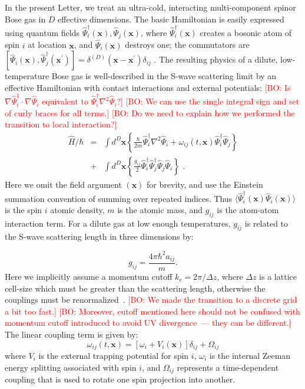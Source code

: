 \documentclass[aps,prl,twocolumn,showpacs,amsmath,amssymb,superscriptaddress]{revtex4-1}
\newcommand{\bogdansremark}[1]{\textcolor{red}{{[}BO: #1{]}}}
\newcommand{\bx}{\boldsymbol{x}}
\begin{document}
In the present Letter, we treat an ultra-cold,
interacting multi-component spinor Bose gas in $D$ effective dimensions.
The basic Hamiltonian is easily expressed using quantum fields
$\widehat{\Psi}_{i}^{\dagger}(\bx),\widehat{\Psi}_{j}(\bx)$,
where $\widehat{\Psi}_{i}^{\dagger}(\bx)$ creates a bosonic atom of spin $i$
at location $\bx$, and $\widehat{\Psi}_{i}(\bx)$ destroys one;
the commutators are
$[\widehat{\Psi}_{i}(\bx),\widehat{\Psi}_{j}^{\dagger}(\bx^\prime)] =
\delta^{(D)}(\bx-\bx^\prime)\delta_{ij}\,\,.$
The resulting physics of a dilute, low-temperature Bose gas
is well-described in the S-wave scattering limit by an effective Hamiltonian
with contact interactions and external potentials:
	\bogdansremark{Is $\nabla \widehat{\Psi}_{i}^{\dagger} \cdot \nabla \widehat{\Psi}_{i}$
	equivalent to $\widehat{\Psi}_{i}^{\dagger} \nabla^2 \widehat{\Psi}_{i}$?}
	\bogdansremark{We can use the single integral sign and set of curly braces for all terms.}
	\bogdansremark{Do we need to explain how we performed the transition to local interaction?}
\begin{eqnarray}
	\widehat{H}/\hbar & = & \int d^{D}\bx \left\{
		\frac{\hbar}{2m} \widehat{\Psi}_{i}^{\dagger} \nabla^2 \widehat{\Psi}_{i} +
		\omega_{ij}(t,\bx) \widehat{\Psi}_{i}^{\dagger} \widehat{\Psi}_{j}
	\right\} \nonumber \\
	& + & \int d^{D}\bx \left\{
		\frac{g_{ij}}{2} \widehat{\Psi}_{i}^{\dagger} \widehat{\Psi}_{j}^{\dagger}
		\widehat{\Psi}_{j} \widehat{\Psi}_{i}
	\right\} \,\,.
\end{eqnarray}
Here we omit the field argument $(\bx)$ for brevity,
and use the Einstein summation convention of summing over repeated indices.
Thus $\langle \widehat{\Psi}_{i}^{\dagger}(\bx) \widehat{\Psi}_{i}(\bx) \rangle$
is the spin $i$ atomic density, $m$ is the atomic mass,
and $g_{ij}$ is the atom-atom interaction term.
For a dilute gas at low enough temperatures,
$g_{ij}$ is related to the S-wave scattering length in three dimensions by:

\begin{equation}
	g_{ij}=\frac{4\pi\hbar^{2}a_{ij}}{m}.
\end{equation}
Here we implicitly assume a momentum cutoff $k_{c}=2\pi/\Delta z$,
where $\Delta z$ is a lattice cell-size which must be greater than the scattering length,
otherwise the couplings must be renormalized~\cite{Sinatra2002}.
	\bogdansremark{We made the transition to a discrete grid a bit too fast.}
	\bogdansremark{Moreover, cutoff mentioned here should not be confused with momentum cutoff
	introduced to avoid UV divergence~--- they can be different.}
The linear coupling term is given by:
\begin{equation}
	\omega_{ij}(t,\bx) = \left[
		\omega_{i}+V_{i} \left( \bx \right)
	\right] \delta_{ij} + \Omega_{ij}
\end{equation}
where $V_{i}$ is the external trapping potential for spin $i$,
$\omega_{i}$ is the internal Zeeman energy splitting associated with spin $i$,
and $\Omega_{ij}$ represents a time-dependent coupling
that is used to rotate one spin projection into another.
\end{document}
